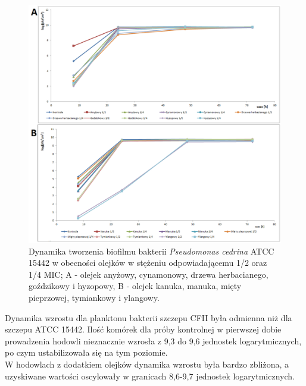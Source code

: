 \documentclass[11pt,a4paper]{report}
\begin{document}
\begin{figure}[!h]
\begin{center}
\includegraphics[scale=0.50]{img/ref-c.png}
\caption{Dynamika tworzenia biofilmu bakterii \textit{Pseudomonas cedrina} ATCC 15442 w obecności olejków w stężeniu odpowiadającemu 1/2 oraz 1/4 MIC; A - olejek anyżowy, cynamonowy, drzewa herbacianego, goździkowy i hyzopowy, B - olejek kanuka, manuka, mięty pieprzowej, tymiankowy i ylangowy.}\label{ref-c}
\end{center} 
\end{figure}

\clearpage

Dynamika wzrostu dla planktonu bakterii szczepu CFII była odmienna niż dla szczepu ATCC 15442. Ilość komórek dla próby kontrolnej w pierwszej dobie prowadzenia hodowli nieznacznie wzrosła z 9,3 do 9,6 jednostek logarytmicznych, po czym ustabilizowała się na tym poziomie.\\
W hodowlach z dodatkiem olejków dynamika wzrostu była bardzo zbliżona, a uzyskiwane wartości oscylowały w granicach 8,6-9,7 jednostek logarytmicznych.
\end{document}
